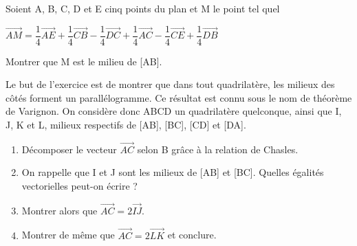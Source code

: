 {\begin{Exercice} %
Soient A, B, C, D et E cinq points du plan et M le point tel quel\\
\begin{center}
$\overrightarrow{AM}=\dfrac{1}{4}\overrightarrow{AE}+\dfrac{1}{4}\overrightarrow{CB}-\dfrac{1}{4}\overrightarrow{DC}+\dfrac{1}{4}\overrightarrow{AC}-\dfrac{1}{4}\overrightarrow{CE}+\dfrac{1}{4}\overrightarrow{DB}$
\end{center}
Montrer que M est le milieu de [AB].

\end{Exercice}


\begin{Exercice} %
Le but de l'exercice est de montrer que dans tout quadrilatère, les milieux des côtés forment un parallélogramme. Ce résultat est connu sous le nom de théorème de Varignon. On considère donc ABCD un quadrilatère quelconque, ainsi que I, J, K et L, milieux respectifs de [AB], [BC], [CD] et [DA].
\begin{enumerate}
\item Décomposer le vecteur $ \overrightarrow{AC} $ selon B grâce à la relation de Chasles.
\item On rappelle que I et J sont les milieux de [AB] et [BC]. Quelles égalités vectorielles peut-on écrire ?
\item Montrer alors que $ \overrightarrow{AC}=2\overrightarrow{IJ} $.
\item Montrer de même que $ \overrightarrow{AC}=2\overrightarrow{LK} $ et conclure.
\end{enumerate}
\end{Exercice}


}
